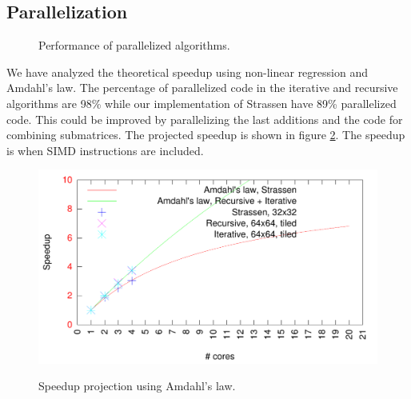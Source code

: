 \subsection{Parallelization}

\begin{figure}[h!]
  \centering
  \label{fig:parallel_performance}
  \caption{Performance of parallelized algorithms.}
\end{figure}

We have analyzed the theoretical speedup using non-linear regression and Amdahl's law. The percentage of parallelized code in the iterative and recursive algorithms are 98\% while our implementation of Strassen have 89\% parallelized code. This could be improved by parallelizing the last additions and the code for combining submatrices. The projected speedup is shown in figure \ref{fig:amdahl}. The speedup is when SIMD instructions are included.

\begin{figure}[h!]
  \centering
  \includegraphics[width=\textwidth]{"../project2/gnuplots/amdahl"}
  \label{fig:amdahl}
  \caption{Speedup projection using Amdahl's law.}
\end{figure}
